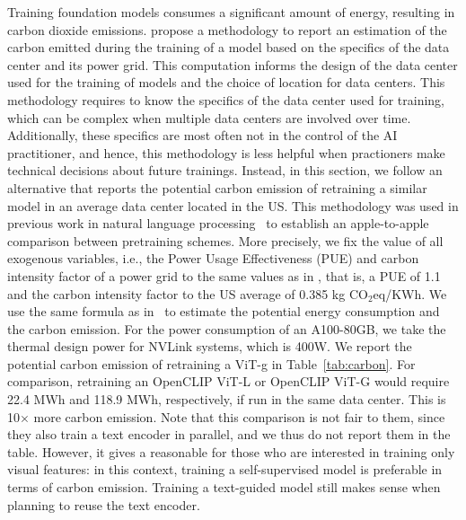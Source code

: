 Training foundation models consumes a significant amount of energy, resulting in carbon dioxide emissions.
\citet{patterson2021carbon} propose a methodology to report an estimation of the carbon emitted during the training of a model based on the specifics of the data center and its power grid.
This computation informs the design of the data center used for the training of models and the choice of location for data centers.
This methodology requires to know the specifics of the data center used for training, which can be complex when multiple data centers are involved over time. 
Additionally, these specifics are most often not in the control of the AI practitioner, and hence, this methodology is less helpful when practioners make technical decisions about future trainings.
Instead, in this section, we follow an alternative that reports the potential carbon emission of retraining a similar model in an average data center located in the US.
This methodology was used in previous work in natural language processing~\citep{strubell2019energy,touvron2023llama} to establish an apple-to-apple comparison between pretraining schemes.
More precisely, we fix the value of all exogenous variables, i.e., the Power Usage Effectiveness (PUE) and carbon intensity factor of a power grid to the same values as in \citet{touvron2023llama}, that is, a PUE of 1.1 and the carbon intensity factor to the US average of 0.385 kg CO$_2$eq/KWh.
We use the same formula as in~\cite{patterson2021carbon} to estimate the potential energy consumption and the carbon emission.
For the power consumption of an A100-80GB, we take the thermal design power for NVLink systems, which is 400W.
We report the potential carbon emission of retraining a \OURS{} ViT-g in Table~\ref{tab:carbon}.
For comparison, retraining an OpenCLIP ViT-L or OpenCLIP ViT-G would require 22.4 MWh and 118.9 MWh, respectively, if run in the same data center. 
This is 10$\times$ more carbon emission.
Note that this comparison is not fair to them, since they also train a text encoder in parallel, and we thus do not report them in the table.
However, it gives a reasonable  for those who are interested in training only visual features: in this context, training a self-supervised model is preferable in terms of carbon emission.
Training a text-guided model still makes sense when planning to reuse the text encoder.


